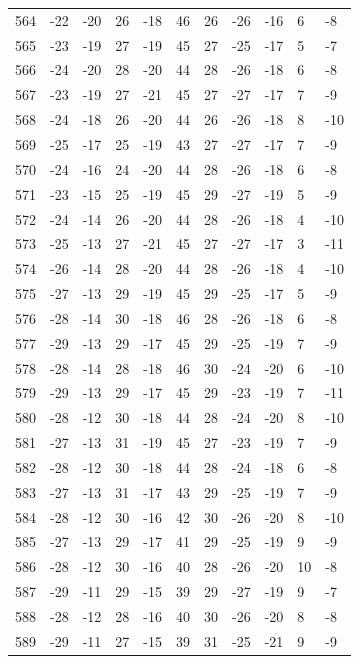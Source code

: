 \begin{table}[H]
\begin{tabular}{lllllllllll}
564 & -22 & -20 & 26 & -18 & 46 & 26 & -26 & -16 & 6 & -8 \\
565 & -23 & -19 & 27 & -19 & 45 & 27 & -25 & -17 & 5 & -7 \\
566 & -24 & -20 & 28 & -20 & 44 & 28 & -26 & -18 & 6 & -8 \\
567 & -23 & -19 & 27 & -21 & 45 & 27 & -27 & -17 & 7 & -9 \\
568 & -24 & -18 & 26 & -20 & 44 & 26 & -26 & -18 & 8 & -10 \\
569 & -25 & -17 & 25 & -19 & 43 & 27 & -27 & -17 & 7 & -9 \\
570 & -24 & -16 & 24 & -20 & 44 & 28 & -26 & -18 & 6 & -8 \\
571 & -23 & -15 & 25 & -19 & 45 & 29 & -27 & -19 & 5 & -9 \\
572 & -24 & -14 & 26 & -20 & 44 & 28 & -26 & -18 & 4 & -10 \\
573 & -25 & -13 & 27 & -21 & 45 & 27 & -27 & -17 & 3 & -11 \\
574 & -26 & -14 & 28 & -20 & 44 & 28 & -26 & -18 & 4 & -10 \\
575 & -27 & -13 & 29 & -19 & 45 & 29 & -25 & -17 & 5 & -9 \\
576 & -28 & -14 & 30 & -18 & 46 & 28 & -26 & -18 & 6 & -8 \\
577 & -29 & -13 & 29 & -17 & 45 & 29 & -25 & -19 & 7 & -9 \\
578 & -28 & -14 & 28 & -18 & 46 & 30 & -24 & -20 & 6 & -10 \\
579 & -29 & -13 & 29 & -17 & 45 & 29 & -23 & -19 & 7 & -11 \\
580 & -28 & -12 & 30 & -18 & 44 & 28 & -24 & -20 & 8 & -10 \\
581 & -27 & -13 & 31 & -19 & 45 & 27 & -23 & -19 & 7 & -9 \\
582 & -28 & -12 & 30 & -18 & 44 & 28 & -24 & -18 & 6 & -8 \\
583 & -27 & -13 & 31 & -17 & 43 & 29 & -25 & -19 & 7 & -9 \\
584 & -28 & -12 & 30 & -16 & 42 & 30 & -26 & -20 & 8 & -10 \\
585 & -27 & -13 & 29 & -17 & 41 & 29 & -25 & -19 & 9 & -9 \\
586 & -28 & -12 & 30 & -16 & 40 & 28 & -26 & -20 & 10 & -8 \\
587 & -29 & -11 & 29 & -15 & 39 & 29 & -27 & -19 & 9 & -7 \\
588 & -28 & -12 & 28 & -16 & 40 & 30 & -26 & -20 & 8 & -8 \\
589 & -29 & -11 & 27 & -15 & 39 & 31 & -25 & -21 & 9 & -9 \\

\end{tabular}
\end{table}
